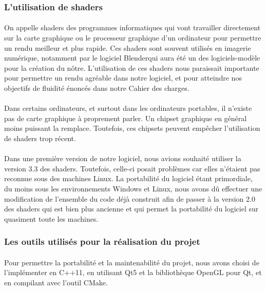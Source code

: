 \subsubsection{L'utilisation de shaders}
\paragraph{}
On appelle shaders des programmes informatiques qui vont travailler directement sur la carte graphique ou le processeur graphique d'un ordinateur pour permettre un rendu meilleur et plus rapide. Ces shaders sont souvent utilisés en imagerie numérique, notamment par le logiciel Blender\footnotemark qui aura été un des logiciels-modèle pour la création du nôtre. L'utilisation de ces shaders nous paraissait importante pour permettre un rendu agréable dans notre logiciel, et pour atteindre nos objectifs de fluidité énoncés dans notre Cahier des charges.
\paragraph{}
Dans certains ordinateurs, et surtout dans les ordinateurs portables, il n'existe pas de carte graphique à proprement parler. Un chipset graphique en général moins puissant la remplace. Toutefois, ces chipsets peuvent empêcher l'utilisation de shaders trop récent.

\paragraph{}
Dans une première version de notre logiciel, nous avions souhaité utiliser la version 3.3 des shaders. Toutefois, celle-ci posait problèmes car elles n'étaient pas reconnue sous des machines Linux. La portabilité du logiciel étant primordiale, du moins sous les environnements Windows et Linux, nous avons dû effectuer une modification de l'ensemble du code déjà construit afin de passer à la version 2.0 des shaders qui est bien plus ancienne et qui permet la portabilité du logiciel sur quasiment toute les machines.

\subsubsection{Les outils utilisés pour la réalisation du projet}
\paragraph{}
Pour permettre la portabilité et la maintenabilité du projet, nous avons choisi de l'implémenter en C++11, en utilisant Qt5 et la bibliothèque OpenGL pour Qt, et en compilant avec l'outil CMake.

